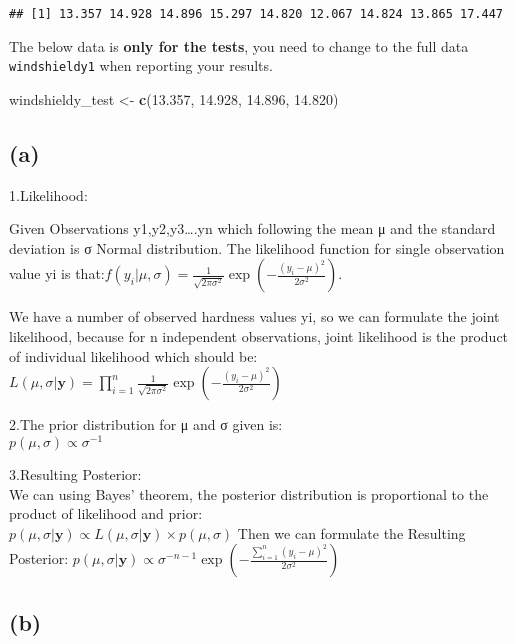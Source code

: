 \documentclass[
]{article}
\newenvironment{Shaded}{\begin{snugshade}}{\end{snugshade}}
\newcommand{\FloatTok}[1]{\textcolor[rgb]{0.00,0.00,0.81}{#1}}
\newcommand{\FunctionTok}[1]{\textcolor[rgb]{0.13,0.29,0.53}{\textbf{#1}}}
\newcommand{\NormalTok}[1]{#1}
\newcommand{\OtherTok}[1]{\textcolor[rgb]{0.56,0.35,0.01}{#1}}
\begin{document}
\begin{verbatim}
## [1] 13.357 14.928 14.896 15.297 14.820 12.067 14.824 13.865 17.447
\end{verbatim}

The below data is \textbf{only for the tests}, you need to change to the
full data \texttt{windshieldy1} when reporting your results.

\begin{Shaded}
\begin{Highlighting}[]
\NormalTok{windshieldy\_test }\OtherTok{\textless{}{-}} \FunctionTok{c}\NormalTok{(}\FloatTok{13.357}\NormalTok{, }\FloatTok{14.928}\NormalTok{, }\FloatTok{14.896}\NormalTok{, }\FloatTok{14.820}\NormalTok{)}
\end{Highlighting}
\end{Shaded}

\hypertarget{a}{%
\subsection{(a)}\label{a}}

1.Likelihood:

Given Observations y1,y2,y3\ldots.yn which following the mean μ and the
standard deviation is σ Normal distribution. The likelihood function for
single observation value yi is
that:\(f(y_i | \mu, \sigma) = \frac{1}{\sqrt{2\pi\sigma^2}} \exp \left( -\frac{(y_i - \mu)^2}{2\sigma^2} \right)\).

We have a number of observed hardness values yi, so we can formulate the
joint likelihood, because for n independent observations, joint
likelihood is the product of individual likelihood which should
be:\(L(\mu, \sigma | \mathbf{y}) = \prod_{i=1}^{n} \frac{1}{\sqrt{2\pi\sigma^2}} \exp \left( -\frac{(y_i - \mu)^2}{2\sigma^2} \right)\)

2.The prior distribution for μ and σ given is:\\
\(p(\mu, \sigma) \propto \sigma^{-1}\)

3.Resulting Posterior:\\
We can using Bayes' theorem, the posterior distribution is proportional
to the product of likelihood and prior:\\
\(p(\mu, \sigma | \mathbf{y}) \propto L(\mu, \sigma | \mathbf{y}) \times p(\mu, \sigma)\)
Then we can formulate the Resulting Posterior:
\(p(\mu, \sigma | \mathbf{y}) \propto \sigma^{-n-1} \exp \left( -\frac{\sum_{i=1}^{n} (y_i - \mu)^2}{2\sigma^2} \right)\)

\hypertarget{b}{%
\subsection{(b)}\label{b}}
\end{document}

